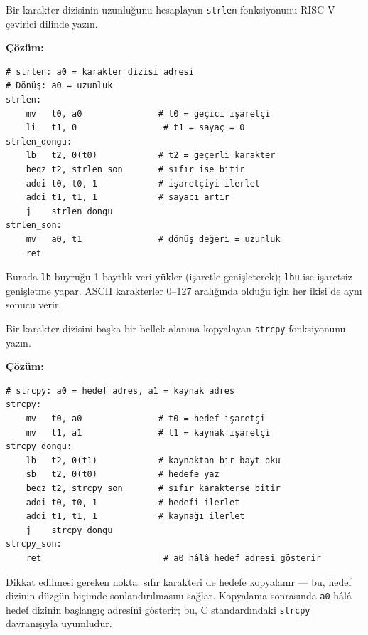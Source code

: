 \begin{ornek}[4.9]
\label{orn:strlen}
Bir karakter dizisinin uzunluğunu hesaplayan \texttt{strlen} fonksiyonunu RISC-V çevirici dilinde yazın.

\textbf{Çözüm:}

\begin{lstlisting}[style=riscv]
# strlen: a0 = karakter dizisi adresi
# Dönüş: a0 = uzunluk
strlen:
    mv   t0, a0               # t0 = geçici işaretçi
    li   t1, 0                 # t1 = sayaç = 0
strlen_dongu:
    lb   t2, 0(t0)            # t2 = geçerli karakter
    beqz t2, strlen_son       # sıfır ise bitir
    addi t0, t0, 1            # işaretçiyi ilerlet
    addi t1, t1, 1            # sayacı artır
    j    strlen_dongu
strlen_son:
    mv   a0, t1               # dönüş değeri = uzunluk
    ret
\end{lstlisting}

Burada \texttt{lb} buyruğu 1 baytlık veri yükler (işaretle genişleterek); \texttt{lbu} ise işaretsiz genişletme yapar. ASCII karakterler 0--127 aralığında olduğu için her ikisi de aynı sonucu verir.
\end{ornek}

\begin{ornek}[4.10]
\label{orn:strcpy}
Bir karakter dizisini başka bir bellek alanına kopyalayan \texttt{strcpy} fonksiyonunu yazın.

\textbf{Çözüm:}

\begin{lstlisting}[style=riscv]
# strcpy: a0 = hedef adres, a1 = kaynak adres
strcpy:
    mv   t0, a0               # t0 = hedef işaretçi
    mv   t1, a1               # t1 = kaynak işaretçi
strcpy_dongu:
    lb   t2, 0(t1)            # kaynaktan bir bayt oku
    sb   t2, 0(t0)            # hedefe yaz
    beqz t2, strcpy_son       # sıfır karakterse bitir
    addi t0, t0, 1            # hedefi ilerlet
    addi t1, t1, 1            # kaynağı ilerlet
    j    strcpy_dongu
strcpy_son:
    ret                        # a0 hâlâ hedef adresi gösterir
\end{lstlisting}

Dikkat edilmesi gereken nokta: sıfır karakteri de hedefe kopyalanır --- bu, hedef dizinin düzgün biçimde sonlandırılmasını sağlar. Kopyalama sonrasında \texttt{a0} hâlâ hedef dizinin başlangıç adresini gösterir; bu, C standardındaki \texttt{strcpy} davranışıyla uyumludur.
\end{ornek}

